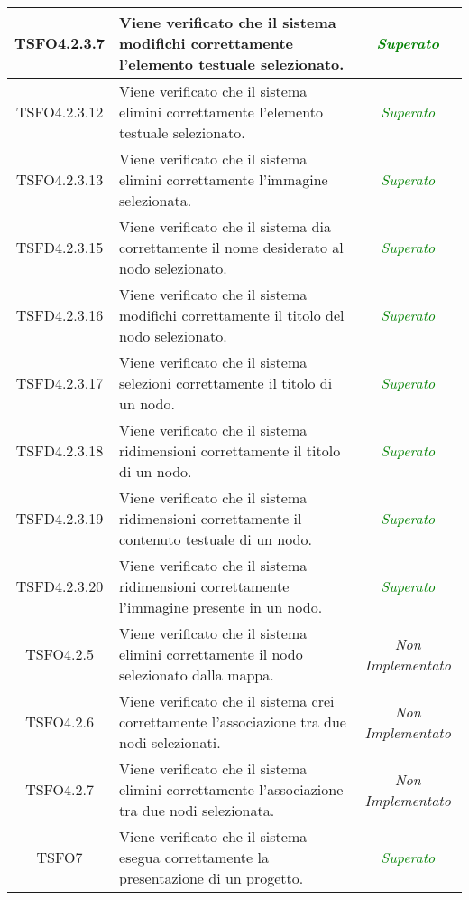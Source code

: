 \begin{longtable}{|c|>{}m{8cm}|c|}
\hypertarget{TSFO4.2.3.7}{TSFO4.2.3.7} & Viene verificato che il sistema modifichi correttamente l'elemento testuale selezionato. & \textcolor{Green}{\textit{Superato}}\\ \hline
\hypertarget{TSFO4.2.3.12}{TSFO4.2.3.12} & Viene verificato che il sistema elimini correttamente l’elemento testuale selezionato. & \textcolor{Green}{\textit{Superato}}\\ \hline
\hypertarget{TSFO4.2.3.13}{TSFO4.2.3.13} & Viene verificato che il sistema elimini correttamente l’immagine selezionata. & \textcolor{Green}{\textit{Superato}}\\ \hline
\hypertarget{TSFD4.2.3.15}{TSFD4.2.3.15} & Viene verificato che il sistema dia correttamente il nome desiderato al nodo selezionato. & \textcolor{Green}{\textit{Superato}}\\ \hline
\hypertarget{TSFD4.2.3.16}{TSFD4.2.3.16} & Viene verificato che il sistema modifichi correttamente il titolo del nodo selezionato. & \textcolor{Green}{\textit{Superato}}\\ \hline
\hypertarget{TSFD4.2.3.17}{TSFD4.2.3.17} & Viene verificato che il sistema selezioni correttamente il titolo di un nodo. & \textcolor{Green}{\textit{Superato}}\\ \hline
\hypertarget{TSFD4.2.3.18}{TSFD4.2.3.18} & Viene verificato che il sistema ridimensioni correttamente il titolo di un nodo. & \textcolor{Green}{\textit{Superato}}\\ \hline
\hypertarget{TSFD4.2.3.19}{TSFD4.2.3.19} & Viene verificato che il sistema ridimensioni correttamente il contenuto testuale di un nodo. & \textcolor{Green}{\textit{Superato}}\\ \hline
\hypertarget{TSFD4.2.3.20}{TSFD4.2.3.20} & Viene verificato che il sistema ridimensioni correttamente l’immagine presente in un nodo. & \textcolor{Green}{\textit{Superato}}\\ \hline
\hypertarget{TSFO4.2.5}{TSFO4.2.5} & Viene verificato che il sistema elimini correttamente il nodo selezionato dalla mappa. & \textit{Non Implementato}\\ \hline
\hypertarget{TSFO4.2.6}{TSFO4.2.6} & Viene verificato che il sistema crei correttamente l’associazione tra due nodi selezionati. & \textit{Non Implementato}\\ \hline
\hypertarget{TSFO4.2.7}{TSFO4.2.7} & Viene verificato che il sistema elimini correttamente l'associazione tra due nodi selezionata. & \textit{Non Implementato}\\ \hline
\hypertarget{TSFO7}{TSFO7} & Viene verificato che il sistema esegua correttamente la presentazione di un progetto. & \textcolor{Green}{\textit{Superato}}\\ \hline

\end{longtable}
